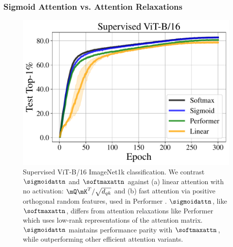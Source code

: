\subsubsection{Sigmoid Attention vs. Attention Relaxations}
\label{sec:attention_relaxations}
\vspace{-0.1in}
\begin{figure}[ht]
   \begin{minipage}{0.5\textwidth}
    \centering
    \includegraphics[width=\linewidth]{figures/test_top1_attn_relaxations.pdf}
  \end{minipage}%
  \hfill
  \begin{minipage}{0.48\textwidth}
    \caption{Supervised ViT-B/16 ImageNet1k classification. We contrast $\sigmoidattn$ and $\softmaxattn$ against (a) linear attention with no activation: $\mQ \mK^T / \sqrt{d_{qk}}$ and (b) fast attention via positive orthogonal random features, used in Performer \citep{DBLP:conf/iclr/ChoromanskiLDSG21}. $\sigmoidattn$, like $\softmaxattn$, differs from attention relaxations like Performer which uses low-rank representations of the attention matrix. $\sigmoidattn$ maintains performance parity with $\softmaxattn$, while outperforming other efficient attention variants.}
    \label{fig:attention_relaxations}
  \end{minipage}  
\end{figure}
